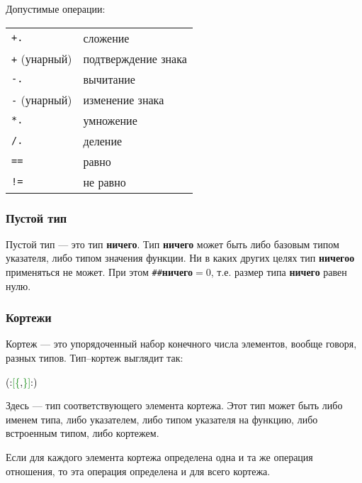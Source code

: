 \documentclass[10pt]{report}
\begin{document}
Допустимые операции:
\begin{longtable}{ll}
\texttt{+.}             & сложение                                          \\
\texttt{+} (унарный)    & подтверждение знака                               \\
\texttt{-.}             & вычитание                                         \\
\texttt{-} (унарный)    & изменение знака                                   \\
\texttt{*.}             & умножение                                         \\
\texttt{/.}             & деление                                           \\
\texttt{==}             & равно                                             \\
\texttt{!=}             & не равно                                          \\
\end{longtable}
        

        \subsubsection{Пустой тип}
Пустой тип --- это тип \textbf{ничего}. Тип \textbf{ничего} может быть либо базовым типом указателя, либо типом значения функции. Ни в каких других целях тип \textbf{ничегоо} применяться не может. При этом \texttt{\#\#}\textbf{ничего}$=0$, т.е. размер типа \textbf{ничего} равен нулю.

        \subsubsection{Кортежи}
Кортеж --- это упорядоченный набор конечного числа элементов, вообще говоря, разных типов. Тип--кортеж выглядит так:
\begin{center}
\noindent\textcolor{Green}{\textcolor{Black}{(:}[\{\textcolor{Black}{,}\}]\textcolor{Black}{:)}}
\end{center}        
   
Здесь \textcolor{Green}{}  --- тип соответствующего элемента кортежа. Этот тип может быть либо именем типа, либо указателем, либо типом указателя на функцию, либо встроенным типом, либо кортежем.

Если для каждого элемента кортежа определена одна и та же операция отношения, то эта операция определена и для всего кортежа.
\end{document}
